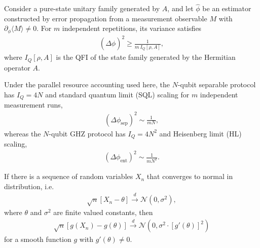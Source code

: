 \begin{theorem}\label{thm:qcrb}
Consider a pure-state unitary family generated by $A$, and let $\hat\phi$ be an estimator constructed by error propagation from a measurement observable $M$ with $\partial_\phi\langle M\rangle\neq0$. 
For $m$ independent repetitions, its variance satisfies
\begin{align}
    (\Delta \hat \phi)^2\geq \frac{1}{m\ I_Q[\rho , A]},
\end{align}
where $I_Q[\rho , A]$ is the QFI of the state family generated by the Hermitian operator $A$.
\end{theorem}

\begin{fact}\label{fact:sql-vs-hl}
Under the parallel resource accounting used here, the $N$-qubit separable protocol has $I_Q=4N$ and standard quantum limit (SQL) scaling for $m$ independent measurement runs,
\begin{align}
    (\Delta \phi_\text{sep})^2 \sim \frac 1 {m N},
\end{align}
whereas the $N$-qubit GHZ protocol has $I_Q=4N^2$ and Heisenberg limit (HL) scaling,
\begin{align}
    (\Delta \phi_\text{ent})^2 \sim \frac 1 {m N^2}.
\end{align}
\end{fact}

\begin{theorem}\label{thm:delta-method}
If there is a sequence of random variables $X_n$ that converges to normal in distribution, i.e.
\begin{align}
\sqrt n [X_n - \theta] \xrightarrow{d} \mathcal N(0, \sigma^2),
\end{align}
where $\theta$ and $\sigma^2$ are finite valued constants, then
\begin{align}
\sqrt n [g(X_n) - g(\theta)]\xrightarrow{d} \mathcal N (0, \sigma^2 \cdot [g'(\theta)] ^2)
\end{align}
for a smooth function $g$ with $g'(\theta)\neq 0$.
\end{theorem}

